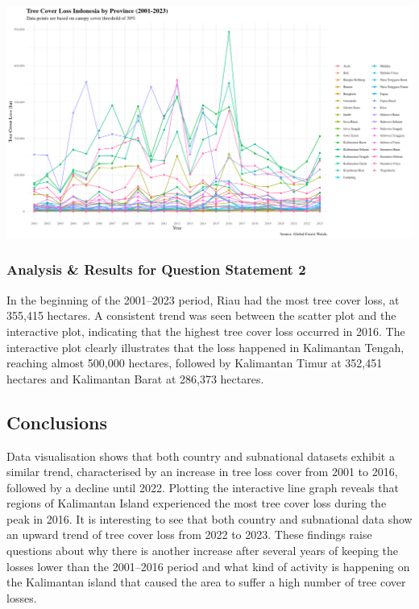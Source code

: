 \documentclass[
]{article}
\begin{document}
\includegraphics{Figures/subnational_figure1.jpg}

\subsubsection{Analysis \& Results for Question Statement
2}\label{analysis-results-for-question-statement-2}

In the beginning of the 2001--2023 period, Riau had the most tree cover
loss, at 355,415 hectares. A consistent trend was seen between the
scatter plot and the interactive plot, indicating that the highest tree
cover loss occurred in 2016. The interactive plot clearly illustrates
that the loss happened in Kalimantan Tengah, reaching almost 500,000
hectares, followed by Kalimantan Timur at 352,451 hectares and
Kalimantan Barat at 286,373 hectares.

\subsection{Conclusions}\label{conclusions}

Data visualisation shows that both country and subnational datasets
exhibit a similar trend, characterised by an increase in tree loss cover
from 2001 to 2016, followed by a decline until 2022. Plotting the
interactive line graph reveals that regions of Kalimantan Island
experienced the most tree cover loss during the peak in 2016. It is
interesting to see that both country and subnational data show an upward
trend of tree cover loss from 2022 to 2023. These findings raise
questions about why there is another increase after several years of
keeping the losses lower than the 2001--2016 period and what kind of
activity is happening on the Kalimantan island that caused the area to
suffer a high number of tree cover losses.
\end{document}
